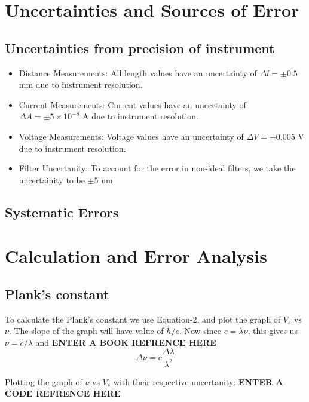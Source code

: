 \documentclass[%
 sor,
 jor,
 amsmath,amssymb,
 reprint,%
]{revtex4-2}
\begin{document}
\section{Uncertainties and Sources of Error}
\subsection{Uncertainties from precision of instrument}
\begin{itemize}
    \item Distance Measurements:
    All length values have an uncertainty of $\Delta l = \pm 0.5$ \si{\milli\meter} due to instrument resolution.    
\item Current Measurements: Current values have an uncertainty of $\Delta A = \pm 5\times10^{-8}$ \si{\ampere} due to instrument resolution. 
    \item Voltage Measurements: Voltage values have an uncertainty of $\Delta V = \pm 0.005$ \si{\volt} due to instrument resolution. 
    \item Filter Uncertanity: To account for the error in non-ideal filters, we take the uncertainity to be $\pm 5$ nm.
\end{itemize}

\subsection{Systematic Errors}

\section{Calculation and Error Analysis}

\subsection{Plank's constant}
To calculate the Plank's constant we use Equation-2, and plot the graph of $V_s$ vs $\nu$. The slope of the graph will have value of $h/e$. Now since $c = \lambda\nu$, this gives us $\nu = c/\lambda$ and \textbf{ENTER A BOOK REFRENCE HERE} $$\Delta \nu = c\frac{\Delta \lambda}{\lambda^2}$$

Plotting the graph of $\nu \text{ vs } V_s$ with their respective uncertanity: \textbf{ENTER A CODE REFRENCE HERE} 
\end{document}
